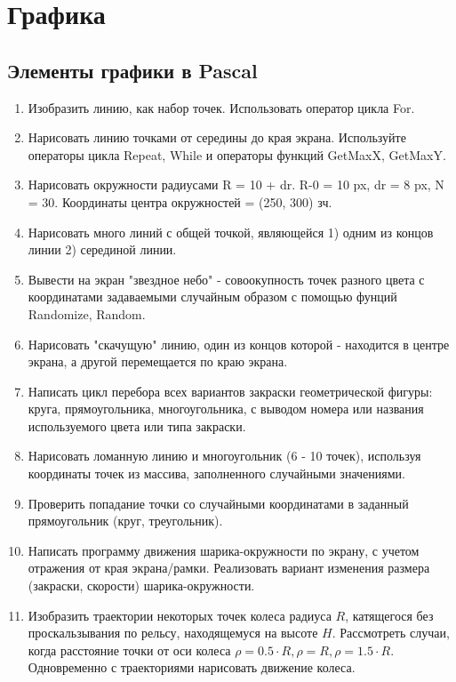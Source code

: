 \section{Графика}

\subsection{Элементы графики в Pascal}

\begin{enumerate}
  \item Изобразить линию, как набор точек. Использовать оператор цикла For.
  \item Нарисовать линию точками от середины до края экрана. Используйте  операторы цикла Repeat, While и операторы функций GetMaxX, GetMaxY.
  \item Нарисовать окружности радиусами R = 10 + dr. R-0 = 10 px, dr = 8 px, N = 30. Координаты центра окружностей = (250, 300) зч.
  \item Нарисовать много линий с общей точкой, являющейся 1) одним из концов линии 2) серединой линии.
  \item Вывести на экран "звездное небо" - совоокупность точек разного цвета с координатами задаваемыми случайным образом с помощью фунций Randomize, Random.
  \item Нарисовать "скачущую" линию, один из концов которой - находится в центре экрана, а другой перемещается по краю экрана. 
  \item Написать цикл перебора всех вариантов закраски геометрической фигуры: круга, прямоугольника, многоугольника, с выводом номера или названия используемого цвета или типа закраски.
  \item Нарисовать ломанную линию и многоугольник (6 - 10 точек), используя координаты точек  из массива, заполненного случайными значениями. 
  \item Проверить попадание точки со случайными координатами в заданный прямоугольник (круг, треугольник).
  
  \item Написать программу движения шарика-окружности по экрану, с учетом отражения от края экрана/рамки. 
        Реализовать вариант изменения размера (закраски, скорости) шарика-окружности.

\item  Изобразить траектории некоторых точек колеса радиуса $R$, катящегося без проскальзывания по рельсу, находящемуся на высоте $H$. Рассмотреть случаи, когда расстояние точки от оси колеса $\rho = 0.5\cdot R, \rho = R, \rho = 1.5\cdot R$. Одновременно с траекториями нарисовать движение колеса.


\end{enumerate}
